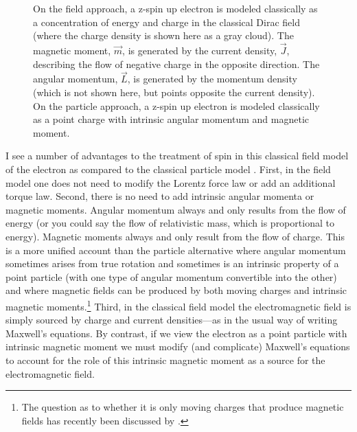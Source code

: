 \documentclass[onecolumn,secnumarabic,amsmath,amssymb,balancelastpage,nofootinbib]{article}
\begin{document}
\begin{figure}[htb]
\caption{On the field approach, a z-spin up electron is modeled classically as a concentration of energy and charge in the classical Dirac field (where the charge density is shown here as a gray cloud).  The magnetic moment, $\vec{m}$, is generated by the current density, $\vec{J}$, describing the flow of negative charge in the opposite direction.  The angular momentum, $\vec{L}$, is generated by the momentum density (which is not shown here, but points opposite the current density).  On the particle approach, a z-spin up electron is modeled classically as a point charge with intrinsic angular momentum and magnetic moment.}
  \label{spinfigure}
\end{figure}


I see a number of advantages to the treatment of spin in this classical field model of the electron as compared to the classical particle model \citep[sec.\ 6]{spinmeasurement}.  First, in the field model one does not need to modify the Lorentz force law or add an additional torque law.  Second, there is no need to add intrinsic angular momenta or magnetic moments.  Angular momentum always and only results from the flow of energy (or you could say the flow of relativistic mass, which is proportional to energy).  Magnetic moments always and only result from the flow of charge.  This is a more unified account than the particle alternative where angular momentum sometimes arises from true rotation and sometimes is an intrinsic property of a point particle (with one type of angular momentum convertible into the other) and where magnetic fields can be produced by both moving charges and intrinsic magnetic moments.\footnote{The question as to whether it is only moving charges that produce magnetic fields has recently been discussed by \citet{fahy2022, griffiths2022}.}  Third, in the classical field model the electromagnetic field is simply sourced by charge and current densities---as in the usual way of writing Maxwell's equations.  By contrast, if we view the electron as a point particle with intrinsic magnetic moment we must modify (and complicate) Maxwell's equations to account for the role of this intrinsic magnetic moment as a source for the electromagnetic field.
\end{document}
